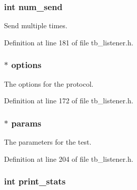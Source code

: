 \hypertarget{structtb__listener__t_a875fd564b2b2de100e6fc2090a06812c}{
\subsubsection[{num\-\_\-send}]{\setlength{\rightskip}{0pt plus 5cm}int num\-\_\-send}}\label{structtb__listener__t_a875fd564b2b2de100e6fc2090a06812c}


Send multiple times. 



Definition at line 181 of file tb\-\_\-listener.\-h.

\hypertarget{structtb__listener__t_abe6a138a14cade5eb871eeb66ee2b638}{
\subsubsection[{options}]{$\ast$ options}}\label{structtb__listener__t_abe6a138a14cade5eb871eeb66ee2b638}


The options for the protocol. 



Definition at line 172 of file tb\-\_\-listener.\-h.

\hypertarget{structtb__listener__t_ada07b15315fdcc71589ed7b50faec50a}{
\subsubsection[{params}]{$\ast$ params}}\label{structtb__listener__t_ada07b15315fdcc71589ed7b50faec50a}


The parameters for the test. 



Definition at line 204 of file tb\-\_\-listener.\-h.

\hypertarget{structtb__listener__t_a21a0be842e8fa2c780fa87f45bd5d17e}{
\subsubsection[{print\-\_\-stats}]{\setlength{\rightskip}{0pt plus 5cm}int print\-\_\-stats}}\label{structtb__listener__t_a21a0be842e8fa2c780fa87f45bd5d17e}


